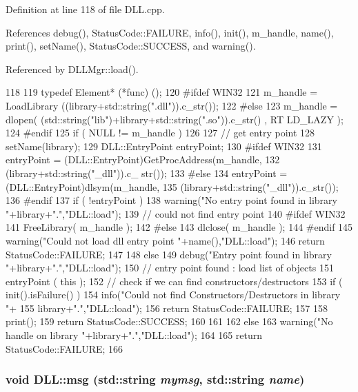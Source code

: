 Definition at line 118 of file DLL.cpp.

References debug(), StatusCode::FAILURE, info(), init(), m\_\-handle, name(), print(), setName(), StatusCode::SUCCESS, and warning().

Referenced by DLLMgr::load().


\begin{DoxyCode}
118                                          {
119   typedef Element* (*func) ();
120 #ifdef WIN32
121   m_handle = LoadLibrary ((library+std::string(".dll")).c_str());
122 #else
123   m_handle = dlopen( (std::string("lib")+library+std::string(".so")).c_str() , RT
      LD_LAZY );
124 #endif
125   if ( NULL != m_handle ) {
126 
127     // get entry point
128     setName(library);
129     DLL::EntryPoint entryPoint;
130 #ifdef WIN32
131     entryPoint = (DLL::EntryPoint)GetProcAddress(m_handle,
132                                                  (library+std::string("_dll")).c_
      str());
133 #else
134     entryPoint = (DLL::EntryPoint)dlsym(m_handle,
135                                        (library+std::string("_dll")).c_str());
136 #endif
137     if ( !entryPoint ) {
138       warning("No entry point found in library "+library+".","DLL::load");
139       // could not find entry point
140 #ifdef WIN32
141       FreeLibrary( m_handle );
142 #else
143       dlclose( m_handle );
144 #endif
145       warning("Could not load dll entry point "+name(),"DLL::load");
146       return StatusCode::FAILURE;
147     }
148     else {
149       debug("Entry point found in library "+library+".","DLL::load");
150       // entry point found : load list of objects
151       entryPoint ( this );
152       // check if we can find constructors/destructors
153       if ( init().isFailure() ) {
154     info("Could not find Constructors/Destructors in library "+
155          library+".","DLL::load");
156         return StatusCode::FAILURE;
157       }
158       print();
159       return StatusCode::SUCCESS;
160     }
161   }
162   else {
163     warning("No handle on library "+library+".","DLL::load");
164   }
165   return StatusCode::FAILURE;
166 }
\end{DoxyCode}
\hypertarget{classDLL_a39585579e6dd045ee39cd74ebecc0525}{
\subsubsection[{msg}]{\setlength{\rightskip}{0pt plus 5cm}void DLL::msg (std::string {\em mymsg}, \/  std::string {\em name})}}
\label{classDLL_a39585579e6dd045ee39cd74ebecc0525}


